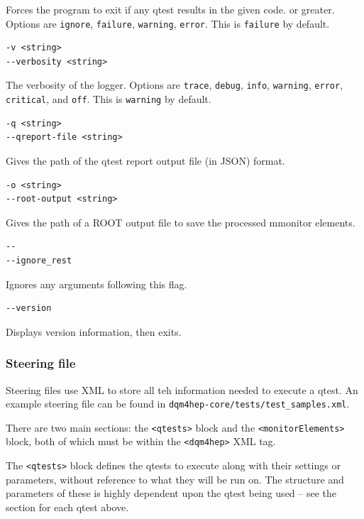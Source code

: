 Forces the program to exit if any qtest results in the given code. or greater. Options are \texttt{ignore}, \texttt{failure}, \texttt{warning}, \texttt{error}. This is \texttt{failure} by default.

\begin{verbatim}
-v <string>
--verbosity <string>
\end{verbatim}

The verbosity of the logger. Options are \texttt{trace}, \texttt{debug}, \texttt{info}, \texttt{warning}, \texttt{error}, \texttt{critical}, and \texttt{off}. This is \texttt{warning} by default.

\begin{verbatim}
-q <string>
--qreport-file <string>
\end{verbatim}

Gives the path of the qtest report output file (in JSON) format.

\begin{verbatim}
-o <string>
--root-output <string>
\end{verbatim}

Gives the path of a ROOT output file to save the processed mmonitor elements.

\begin{verbatim}
--
--ignore_rest
\end{verbatim}

Ignores any arguments following this flag.

\begin{verbatim}
--version
\end{verbatim}

Displays version information, then exits.

\subsubsection{Steering file}
Steering files use XML to store all teh information needed to execute a qtest. An example steering file can be found in \texttt{dqm4hep-core/tests/test\_samples.xml}.

There are two main sections: the \texttt{<qtests>} block and the \texttt{<monitorElements>} block, both of which must be within the \texttt{<dqm4hep>} XML tag.

The \texttt{<qtests>} block defines the qtests to execute along with their settings or parameters, without reference to what they will be run on. The structure and parameters of these is highly dependent upon the qtest being used – see the section for each qtest above.

